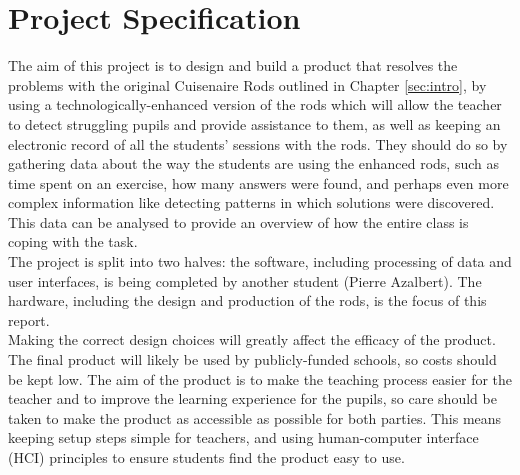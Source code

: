 \chapter{Project Specification}

 The aim of this project is to design and build a product that resolves the problems with the original Cuisenaire\textsuperscript{\textregistered} Rods outlined in Chapter \ref{sec:intro}, by using a technologically-enhanced version of the rods which will allow the teacher to detect struggling pupils and provide assistance to them, as well as keeping an electronic record of all the students' sessions with the rods. They should do so by gathering data about the way the students are using the enhanced rods, such as time spent on an exercise, how many answers were found, and perhaps even more complex information like detecting patterns in which solutions were discovered. This data can be analysed to provide an overview of how the entire class is coping with the task.\\

The project is split into two halves: the software, including processing of data and user interfaces, is being completed by another student (Pierre Azalbert). The hardware, including the design and production of the rods, is the focus of this report.\\


Making the correct design choices will greatly affect the efficacy of the product. The final product will likely be used by publicly-funded schools, so costs should be kept low. The aim of the product is to make the teaching process easier for the teacher and to improve the learning experience for the pupils, so care should be taken to make the product as accessible as possible for both parties. This means keeping setup steps simple for teachers, and using human-computer interface (HCI) principles to ensure students find the product easy to use. 


